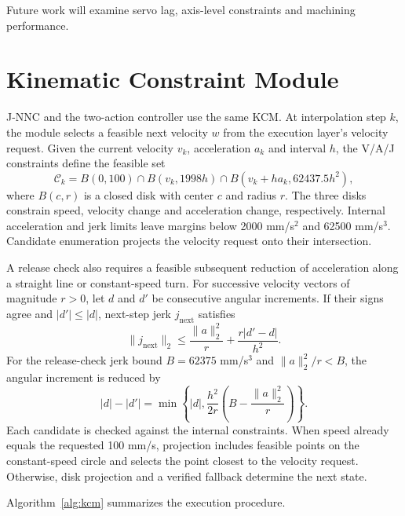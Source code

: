 \documentclass[preprint,12pt,nonatbib]{elsarticle}
\begin{document}
Future work will examine servo lag, axis-level constraints and machining performance.

\appendix
\section{Kinematic Constraint Module}
\label{app:kcm}
J-NNC and the two-action controller use the same KCM. At interpolation step $k$, the module selects a feasible next velocity $w$ from the execution layer's velocity request. Given the current velocity $v_k$, acceleration $a_k$ and interval $h$, the V/A/J constraints define the feasible set
\begin{equation}
\mathcal C_k=B(0,100)\cap B(v_k,1998h)\cap B(v_k+h a_k,62437.5h^2),
\label{eq:disks}
\end{equation}
where $B(c,r)$ is a closed disk with center $c$ and radius $r$. The three disks constrain speed, velocity change and acceleration change, respectively. Internal acceleration and jerk limits leave margins below 2000 mm/s$^2$ and 62500 mm/s$^3$. Candidate enumeration projects the velocity request onto their intersection.

A release check also requires a feasible subsequent reduction of acceleration along a straight line or constant-speed turn. For successive velocity vectors of magnitude $r>0$, let $d$ and $d'$ be consecutive angular increments. If their signs agree and $|d'|\leq|d|$, next-step jerk $j_{\mathrm{next}}$ satisfies
\begin{equation}
\|j_{\mathrm{next}}\|_2\leq \frac{\|a\|_2^2}{r}+\frac{r|d'-d|}{h^2}.
\end{equation}
For the release-check jerk bound $B=62375$ mm/s$^3$ and $\|a\|_2^2/r<B$, the angular increment is reduced by
\begin{equation}
|d|-|d'|=\min\!\left\{|d|,\frac{h^2}{2r}\left(B-\frac{\|a\|_2^2}{r}\right)\right\}.
\end{equation}
Each candidate is checked against the internal constraints. When speed already equals the requested 100 mm/s, projection includes feasible points on the constant-speed circle and selects the point closest to the velocity request. Otherwise, disk projection and a verified fallback determine the next state.

Algorithm~\ref{alg:kcm} summarizes the execution procedure.
\end{document}
